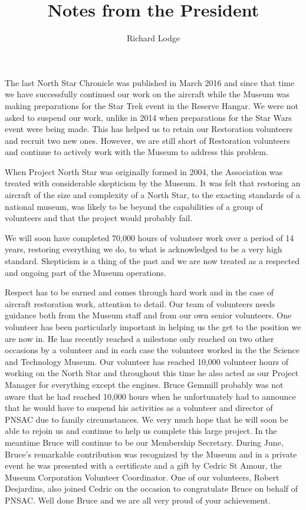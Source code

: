 
%


\title{Notes from the President}
\author{Richard Lodge}

\maketitle

The last North Star Chronicle was published in March 2016 and since that time we
have successfully continued our work on the aircraft while the Museum was making
preparations for the Star Trek event in the Reserve Hangar. We were not asked to
suspend our work, unlike in 2014 when preparations for the Star Wars event were
being made. This has helped us to retain our Restoration volunteers and recruit
two new ones. However, we are still short of Restoration volunteers and continue
to actively work with the Museum to address this problem.

When Project North Star was originally formed in 2004, the Association was
treated with considerable skepticism by the Museum. It was felt that restoring
an aircraft of the size and complexity of a North Star, to the exacting
standards of a national museum, was likely to be beyond the capabilities of a
group of volunteers and that the project would probably fail.

We will soon have completed 70,000 hours of volunteer work over a period of 14
years, restoring everything we do, to what is acknowledged to be a very high
standard. Skepticism is a thing of the past and we are now treated as a
respected and ongoing part of the Museum operations.

Respect has to be earned and comes through hard work and in the case of aircraft
restoration work, attention to detail. Our team of volunteers needs guidance
both from the Museum staff and from our own senior volunteers. One volunteer has
been particularly important in helping us the get to the position we are now in.
He has recently reached a milestone only reached on two other occasions by a
volunteer and in each case the volunteer worked in the the Science and
Technology Museum. Our volunteer has reached 10,000 volunteer hours of working
on the North Star and throughout this time he also acted as our Project Manager
for everything except the engines. Bruce Gemmill probably was not aware that he
had reached 10,000 hours when he unfortunately had to announce that he would
have to suspend his activities as a volunteer and director of PNSAC due to
family circumstances. We very much hope that he will soon be able to rejoin us
and continue to help us complete this large project. In the meantime Bruce will
continue to be our Membership Secretary. During June, Bruce's remarkable
contribution was recognized by the Museum and in a private event he was
presented with a certificate and a gift by Cedric St Amour, the Museum
Corporation Volunteer Coordinator. One of our volunteers, Robert Desjardins,
also joined Cedric on the occasion to congratulate Bruce on behalf of PNSAC.
Well done Bruce and we are all very proud of your achievement.

